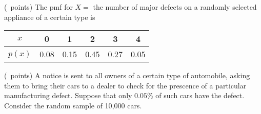 \begin{questions}
    
    \question (\totalpoints\ points) The pmf for $X = $ the number of
    major defects on a randomly selected appliance of a certain type
    is
    \begin{tabular}{c|ccccc}
    $x$ & 0 & 1 & 2 & 3 & 4 \\
    \hline
    $p(x)$ & 0.08 & 0.15 & 0.45 & 0.27 & 0.05 \\
    \end{tabular}



    \question (\totalpoints\ points) A notice is sent to all owners of
    a certain type of automobile, asking them to bring their cars to a
    dealer to check for the prescence of a particular manufacturing
    defect. Suppose that only $0.05$\% of such cars have the
    defect. Consider the random sample of 10,000 cars.

\end{questions}

